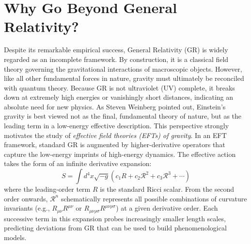 \section*{Why Go Beyond General Relativity?}
Despite its remarkable empirical success, General Relativity (GR) is widely regarded as an incomplete framework. By construction, it is a classical field theory governing the gravitational interactions of macroscopic objects. However, like all other fundamental forces in nature, gravity must ultimately be reconciled with quantum theory. Because GR is not ultraviolet (UV) complete, it breaks down at extremely high energies or vanishingly short distances, indicating an absolute need for new physics. As Steven Weinberg pointed out, Einstein's gravity is best viewed not as the final, fundamental theory of nature, but as the leading term in a low-energy effective description. This perspective strongly motivates the study of \emph{effective field theories (EFTs) of gravity}. In an EFT framework, standard GR is augmented by higher-derivative operators that capture the low-energy imprints of high-energy dynamics. The effective action takes the form of an infinite derivative expansion:
\begin{equation}
    S = \int d^4x \sqrt{-g} \left( c_1 R + c_2 \mathcal{R}^2 + c_3 \mathcal{R}^3 + \cdots \right)
\end{equation}
where the leading-order term $R$ is the standard Ricci scalar. From the second order onwards, $\mathcal{R}^n$ schematically represents all possible combinations of curvature invariants (e.g., $R_{\mu\nu}R^{\mu\nu}$ or $R_{\mu\nu\rho\sigma}R^{\mu\nu\rho\sigma}$) at a given derivative order. Each successive term in this expansion probes increasingly smaller length scales, predicting deviations from GR that can be used to build phenomenological models. 

